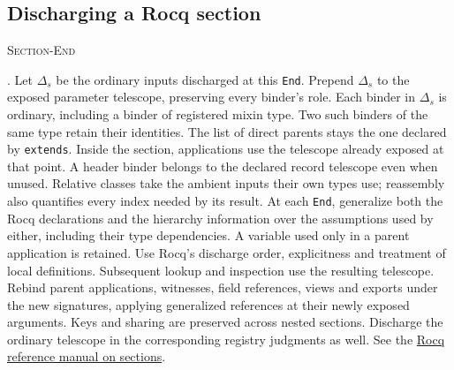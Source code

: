 \documentclass{article}
\newcommand{\ttt}[1]{\texttt{#1}}
\newcommand{\rdefn}[1]{\hypertarget{rule-#1}{\textsc{#1}}}
\begin{document}
\subsection{Discharging a Rocq section}

\rdefn{Section-End}. Let $\Delta_s$ be the ordinary inputs discharged at this \ttt{End}.
Prepend $\Delta_s$ to the exposed parameter telescope, preserving every
binder's role. Each binder in $\Delta_s$ is ordinary, including a binder
of registered mixin type. Two such binders of the same type retain their
identities. The list of direct parents stays the one declared by
\ttt{extends}. Inside the section, applications use the telescope already
exposed at that point.
A header binder belongs to the declared record telescope even when unused.
Relative classes take the ambient inputs their own types use; reassembly
also quantifies every index needed by its result.
At each \ttt{End}, generalize both the Rocq declarations and the hierarchy
information over the assumptions used by either, including their type
dependencies. A variable used only in a parent application is retained.
Use Rocq's discharge order, explicitness and treatment of local definitions.
Subsequent lookup and inspection use the resulting telescope. Rebind parent
applications, witnesses, field references, views and exports under the
new signatures, applying generalized references at their newly exposed
arguments. Keys and sharing are preserved across nested sections. Discharge the
ordinary telescope in the corresponding registry judgments as well.
See the \href{https://rocq-prover.org/doc/V9.3.0/refman/language/core/sections.html}{Rocq reference manual on sections}.
\end{document}
